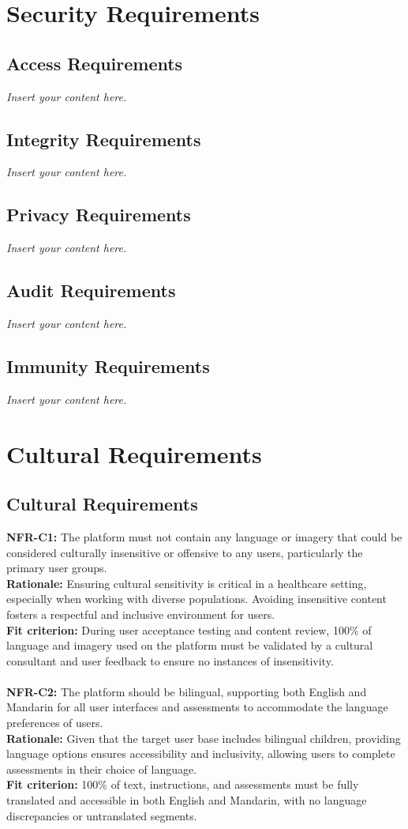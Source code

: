 \documentclass[12pt]{article}
\newcommand{\lips}{\textit{Insert your content here.}}
\begin{document}
\section{Security Requirements}
\subsection{Access Requirements}
\lips
\subsection{Integrity Requirements}
\lips
\subsection{Privacy Requirements}
\lips
\subsection{Audit Requirements}
\lips
\subsection{Immunity Requirements}
\lips

\section{Cultural Requirements}
\subsection{Cultural Requirements}
\textbf{NFR-C1: }The platform must not contain any language or imagery that could be considered culturally insensitive or offensive to any users, particularly the primary user groups.\\
\textbf{Rationale: }Ensuring cultural sensitivity is critical in a healthcare setting, especially when working with diverse populations. Avoiding insensitive content fosters a respectful and inclusive environment 
for users.\\
\textbf{Fit criterion: }During user acceptance testing and content review, 100\% of language and imagery used on the platform must be validated by a cultural consultant and user feedback to ensure no instances of 
insensitivity.\\\\
\textbf{NFR-C2: }The platform should be bilingual, supporting both English and Mandarin for all user interfaces and assessments to accommodate the language preferences of users.\\
\textbf{Rationale: }Given that the target user base includes bilingual children, providing language options ensures accessibility and inclusivity, allowing users to complete assessments in their choice of language.\\
\textbf{Fit criterion: }100\% of text, instructions, and assessments must be fully translated and accessible in both English and Mandarin, with no language discrepancies or untranslated segments.\\\\
\end{document}
